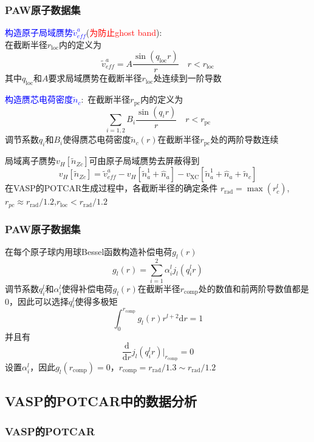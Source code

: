{\frame
{
	\frametitle{\textrm{PAW}原子数据集}
	\textcolor{blue}{构造原子局域赝势$\tilde v_{e\!f\!f}^a$}(\textcolor{red}{为防止\textrm{ghost band}}):\\在截断半径$r_{\mathrm{loc}}$内的定义为
	$$\tilde v_{e\!f\!f}^a=A\dfrac{\sin(q_{\mathrm{loc}}r)}r\quad r<r_{\mathrm{loc}}$$
	其中$q_{\mathrm{loc}}$和$A$要求局域赝势在截断半径$r_{\mathrm{loc}}$处连续到一阶导数

	\textcolor{blue}{构造赝芯电荷密度$\tilde n_c$}:~在截断半径$r_{\mathrm{pc}}$内的定义为
	$$\sum_{i=1,2}B_i\dfrac{\sin(q_ir)}r\quad r<r_{\mathrm{pc}}$$
	调节系数$q_i$和$B_i$使得赝芯电荷密度$\tilde n_c(r)$在截断半径$r_{\mathrm{pc}}$处的两阶导数连续

	局域离子赝势$v_H[\tilde n_{Zc}]$可由原子局域赝势去屏蔽得到
	$$v_H[\tilde n_{Zc}]=\tilde v_{e\!f\!f}^a-v_H[\tilde n_a^1+\hat n_a]-v_{\mathrm{XC}}[\tilde n_a^1+\hat n_a+\tilde n_c]$$
	在\textrm{VASP}的\textrm{POTCAR}生成过程中，各截断半径的确定条件
	$r_{\mathrm{rad}}=\max({r_c^l})$,$r_{pc}\approx r_{\mathrm{rad}}/1.2$,$r_{\mathrm{loc}}<r_{\mathrm{rad}}/1.2$
}

\frame
{
	\frametitle{\textrm{PAW}原子数据集}
	在每个原子球内用球\textrm{Bessel}函数构造补偿电荷$g_l(r)$
	$$g_l(r)=\sum_{i=1}^2\alpha_i^lj_l(q_i^lr)$$
	调节系数$q_i^l$和$\alpha_i^l$使得补偿电荷$g_l(r)$在截断半径$r_{\mathrm{comp}}$处的数值和前两阶导数值都是0，因此可以选择$q_i^l$使得多极矩
	$$\int_0^{r_{\mathrm{comp}}}g_l(r)r^{l+2}\mathrm{d}r=1$$
	并且有
	$$\dfrac{\mathrm{d}}{\mathrm{d}r}j_l(q_i^lr)\bigg|_{r_{\mathrm{comp}}}=0$$
	设置$\alpha_i^l$，因此$g_l(r_{\mathrm{comp}})=0$，$r_{\mathrm{comp}}=r_{\mathrm{rad}}/1.3\sim r_{\mathrm{rad}}/1.2$
}

\subsection{\rm{VASP}的\rm{POTCAR}中的数据分析}
\frame
{
	\frametitle{\rm{VASP}的\rm{POTCAR}}
\centering
\vspace{-0.15in}
\fontsize{4.8pt}{4.2pt}\selectfont{
}
}

}

